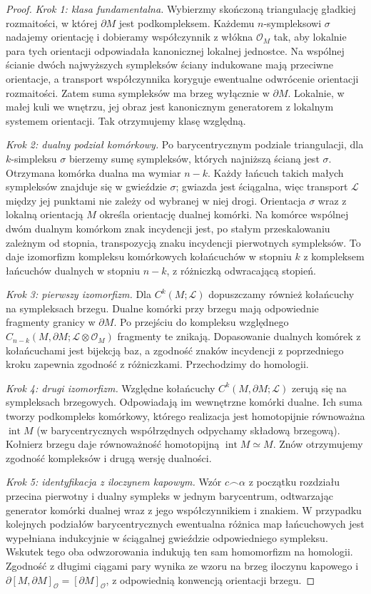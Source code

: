 \begin{proof}
\emph{Krok 1: klasa fundamentalna.}
Wybierzmy skończoną triangulację gładkiej rozmaitości,
w której $\partial M$ jest podkompleksem. Każdemu
$n$-sympleksowi $\sigma$ nadajemy orientację i dobieramy
współczynnik z włókna $\mathcal O_M$ tak, aby lokalnie
para tych orientacji odpowiadała kanonicznej lokalnej
jednostce. Na wspólnej ścianie dwóch najwyższych
sympleksów ściany indukowane mają przeciwne orientacje,
a transport współczynnika koryguje ewentualne odwrócenie
orientacji rozmaitości. Zatem suma sympleksów ma brzeg
wyłącznie w $\partial M$. Lokalnie, w małej kuli we wnętrzu,
jej obraz jest kanonicznym generatorem z lokalnym
systemem orientacji. Tak otrzymujemy klasę względną.

\emph{Krok 2: dualny podział komórkowy.}
Po barycentrycznym podziale triangulacji, dla $k$-simpleksu
$\sigma$ bierzemy sumę sympleksów, których najniższą
ścianą jest $\sigma$. Otrzymana komórka dualna ma wymiar
$n-k$. Każdy łańcuch takich małych sympleksów znajduje się
w gwieździe $\sigma$; gwiazda jest ściągalna, więc
transport $\mathcal L$ między jej punktami nie zależy od
wybranej w niej drogi. Orientacja $\sigma$ wraz z lokalną
orientacją $M$ określa orientację dualnej komórki.
Na komórce wspólnej dwóm dualnym komórkom znak incydencji
jest, po stałym przeskalowaniu zależnym od stopnia,
transpozycją znaku incydencji pierwotnych sympleksów.
To daje izomorfizm kompleksu komórkowych kołańcuchów
w stopniu $k$ z kompleksem łańcuchów dualnych w stopniu
$n-k$, z różniczką odwracającą stopień.

\emph{Krok 3: pierwszy izomorfizm.}
Dla $C^k(M;\mathcal L)$ dopuszczamy również kołańcuchy
na sympleksach brzegu. Dualne komórki przy brzegu mają
odpowiednie fragmenty granicy w $\partial M$.
Po przejściu do kompleksu względnego
$C_{n-k}(M,\partial M;\mathcal L\otimes\mathcal O_M)$
fragmenty te znikają. Dopasowanie dualnych komórek
z kołańcuchami jest bijekcją baz, a zgodność znaków
incydencji z poprzedniego kroku zapewnia zgodność z
różniczkami. Przechodzimy do homologii.

\emph{Krok 4: drugi izomorfizm.}
Względne kołańcuchy $C^k(M,\partial M;\mathcal L)$
zerują się na sympleksach brzegowych. Odpowiadają im
wewnętrzne komórki dualne. Ich suma tworzy podkompleks
komórkowy, którego realizacja jest homotopijnie równoważna
$\operatorname{int}M$ (w barycentrycznych współrzędnych
odpychamy składową brzegową). Kołnierz brzegu daje
równoważność homotopijną $\operatorname{int}M\simeq M$.
Znów otrzymujemy zgodność kompleksów i drugą wersję dualności.

\emph{Krok 5: identyfikacja z iloczynem kapowym.}
Wzór $c\frown\alpha$ z początku rozdziału przecina
pierwotny i dualny sympleks w jednym barycentrum,
odtwarzając generator komórki dualnej wraz z jego
współczynnikiem i znakiem. W przypadku kolejnych podziałów
barycentrycznych ewentualna różnica map łańcuchowych
jest wypełniana indukcyjnie w ściągalnej gwieździe
odpowiedniego sympleksu. Wskutek tego oba odwzorowania
indukują ten sam homomorfizm na homologii.
Zgodność z długimi ciągami pary wynika ze wzoru na
brzeg iloczynu kapowego i
$\partial[M,\partial M]_{\mathcal O}=[\partial M]_{\mathcal O}$,
z odpowiednią konwencją orientacji brzegu.
\end{proof}
